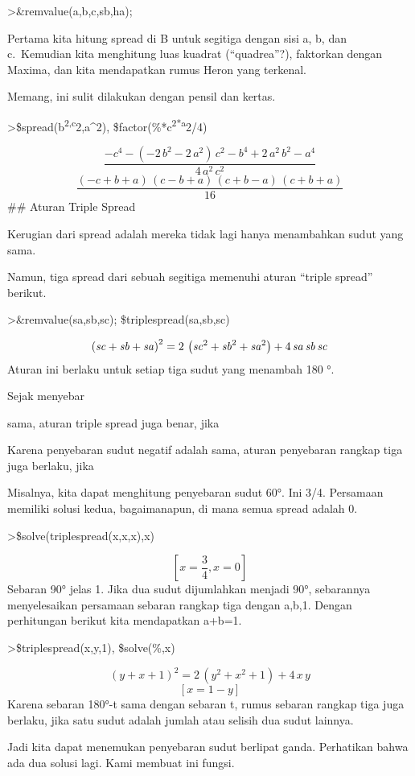 \documentclass[
]{book}
\begin{document}
\textgreater\&remvalue(a,b,c,sb,ha);

Pertama kita hitung spread di B untuk segitiga dengan sisi a, b, dan c.~Kemudian kita menghitung luas kuadrat (``quadrea''?), faktorkan dengan Maxima, dan kita mendapatkan rumus Heron yang terkenal.

Memang, ini sulit dilakukan dengan pensil dan kertas.

\textgreater\$spread(b\textsuperscript{2,c}2,a\^{}2), \$factor(\%*c\textsuperscript{2*a}2/4)

\[\frac{-c^4-\left(-2\,b^2-2\,a^2\right)\,c^2-b^4+2\,a^2\,b^2-a^4}{4 \,a^2\,c^2}\] \[\frac{\left(-c+b+a\right)\,\left(c-b+a\right)\,\left(c+b-a\right)\,\left(c+b+a\right)}{16}\]\#\# Aturan Triple Spread

Kerugian dari spread adalah mereka tidak lagi hanya menambahkan sudut yang sama.

Namun, tiga spread dari sebuah segitiga memenuhi aturan ``triple spread'' berikut.

\textgreater\&remvalue(sa,sb,sc); \$triplespread(sa,sb,sc)

\[\left({\it sc}+{\it sb}+{\it sa}\right)^2=2\,\left({\it sc}^2+ {\it sb}^2+{\it sa}^2\right)+4\,{\it sa}\,{\it sb}\,{\it sc}\]Aturan ini berlaku untuk setiap tiga sudut yang menambah 180 °.

Sejak menyebar

sama, aturan triple spread juga benar, jika

Karena penyebaran sudut negatif adalah sama, aturan penyebaran rangkap tiga juga berlaku, jika

Misalnya, kita dapat menghitung penyebaran sudut 60°. Ini 3/4. Persamaan memiliki solusi kedua, bagaimanapun, di mana semua spread adalah 0.

\textgreater\$solve(triplespread(x,x,x),x)

\[\left[ x=\frac{3}{4} , x=0 \right]\]Sebaran 90° jelas 1. Jika dua sudut dijumlahkan menjadi 90°, sebarannya menyelesaikan persamaan sebaran rangkap tiga dengan a,b,1. Dengan perhitungan berikut kita mendapatkan a+b=1.

\textgreater\$triplespread(x,y,1), \$solve(\%,x)

\[\left(y+x+1\right)^2=2\,\left(y^2+x^2+1\right)+4\,x\,y\] \[\left[ x=1-y \right]\]Karena sebaran 180°-t sama dengan sebaran t, rumus sebaran rangkap tiga juga berlaku, jika satu sudut adalah jumlah atau selisih dua sudut lainnya.

Jadi kita dapat menemukan penyebaran sudut berlipat ganda. Perhatikan bahwa ada dua solusi lagi. Kami membuat ini fungsi.
\end{document}
